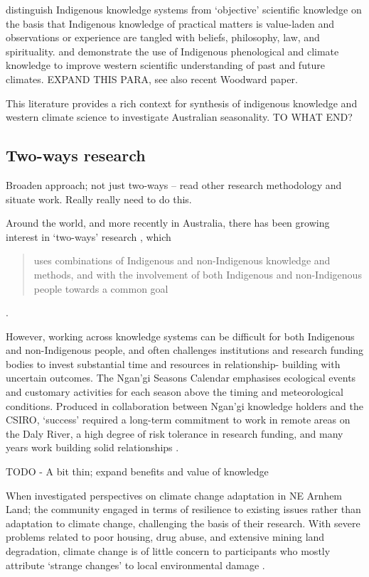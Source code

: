 \citet{turner2009} distinguish Indigenous knowledge systems from `objective' 
scientific knowledge on the basis that Indigenous knowledge of practical 
matters is value-laden and observations or experience are tangled with beliefs, 
philosophy, law, and spirituality.  \citet{green2010a} and \citet{clarke2009} 
demonstrate the use of Indigenous phenological and climate knowledge to improve 
western scientific understanding of past and future climates.
EXPAND THIS PARA, see also recent Woodward paper.

This literature provides a rich context for synthesis of indigenous knowledge 
and western climate science to investigate Australian seasonality.
TO WHAT END?



\subsection{Two-ways research}
Broaden approach; not just two-ways – read other research methodology and 
situate work.  Really really need to do this.

Around the world, and more recently in Australia, there has been growing 
interest in `two-ways' research \citep{turner2009,prober2011}, 
which \blockquote{uses combinations of Indigenous and non-Indigenous knowledge and 
methods, and with the involvement of both Indigenous and non-Indigenous people 
towards a common goal} \citep{ens2014}.  

However, working across knowledge systems can be difficult for both Indigenous 
and non-Indigenous people, and often challenges institutions and research 
funding bodies to invest substantial time and resources in relationship-
building with uncertain outcomes.  The Ngan'gi Seasons Calendar emphasises 
ecological events and customary activities for each season above the timing and 
meteorological conditions.  Produced in collaboration between Ngan'gi knowledge 
holders and the CSIRO, `success' required a long-term commitment to work in 
remote areas on the Daly River, a high degree of risk tolerance in 
research funding, and many years work building solid relationships \citep{woodward2010}.

TODO - A bit thin; expand benefits and value of knowledge

When \citet{petheram2010} investigated perspectives on climate change 
adaptation in NE Arnhem Land; the community engaged in terms of resilience to 
existing issues rather than adaptation to climate change, challenging the basis 
of their research.  With severe problems related to poor housing, drug abuse, 
and extensive mining land degradation, climate change is of little concern to 
participants who mostly attribute `strange changes' to local environmental 
damage \citep{green2010a}.




